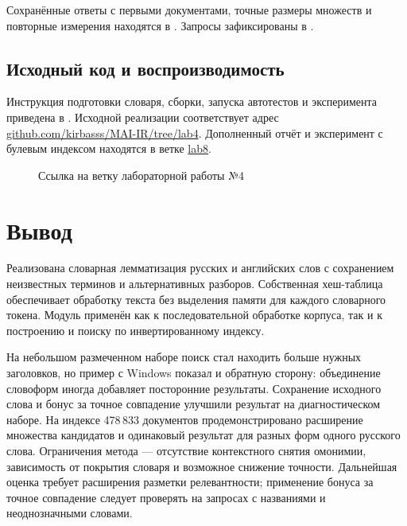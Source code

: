 \documentclass[12pt,a4paper]{article}
\newcommand{\code}[1]{\texttt{\detokenize{#1}}}
\begin{document}
Сохранённые ответы с первыми документами, точные размеры множеств
и повторные измерения находятся в .
Запросы зафиксированы в .

\subsection{Исходный код и воспроизводимость}

Инструкция подготовки словаря, сборки, запуска автотестов и эксперимента
приведена в \code{doc/lab4_run.md}. Исходной реализации соответствует адрес
\href{https://github.com/kirbasss/MAI-IR/tree/lab4}{github.com/kirbasss/MAI-IR/tree/lab4}.
Дополненный отчёт и эксперимент с булевым индексом находятся в ветке
\href{https://github.com/kirbasss/MAI-IR/tree/lab8}{lab8}.

\begin{figure}[htbp]
\centering
\begingroup
\hypersetup{urlcolor=black}
\endgroup
\caption{Ссылка на ветку лабораторной работы №4}
\end{figure}

\section{Вывод}

Реализована словарная лемматизация русских и английских слов
с сохранением неизвестных терминов и альтернативных разборов.
Собственная хеш-таблица обеспечивает обработку текста без выделения
памяти для каждого словарного токена. Модуль применён как к последовательной
обработке корпуса, так и к построению и поиску по инвертированному индексу.

На небольшом размеченном наборе поиск стал находить больше нужных заголовков,
но пример с Windows показал и обратную сторону: объединение словоформ
иногда добавляет посторонние результаты. Сохранение исходного слова и бонус
за точное совпадение улучшили результат на диагностическом наборе.
На индексе 478\,833 документов продемонстрировано расширение множества
кандидатов и одинаковый результат для разных форм одного русского слова.
Ограничения метода --- отсутствие контекстного снятия омонимии,
зависимость от покрытия словаря и возможное снижение точности.
Дальнейшая оценка требует расширения разметки релевантности;
применение бонуса за точное совпадение следует проверять
на запросах с названиями и неоднозначными словами.
\end{document}
